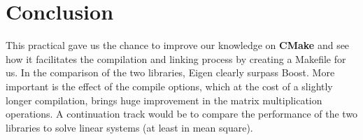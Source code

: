 \newpage

\section{Conclusion}
This practical gave us the chance to improve our knowledge on \textbf{CMake} and see how it facilitates the compilation and linking process by creating a Makefile for us.
In the comparison of the two libraries, Eigen clearly surpass Boost. More important is the effect of the compile options, which at the cost of a slightly longer compilation, brings huge improvement in the matrix multiplication operations.
A continuation track would be to compare the performance of the two libraries to solve linear systems (at least in mean square).

